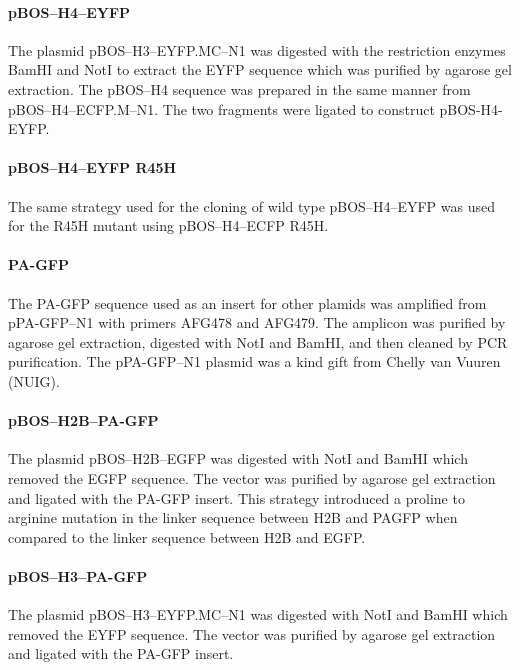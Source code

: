       \paragraph{pBOS--H4--EYFP}
      The plasmid pBOS--H3--EYFP.MC--N1 was digested with the
      restriction enzymes BamHI and NotI to extract the EYFP sequence
      which was purified by agarose gel extraction.  The pBOS--H4
      sequence was prepared in the same manner from
      pBOS--H4--ECFP.M--N1.  The two fragments were ligated to
      construct pBOS-H4-EYFP.

      \paragraph{pBOS--H4--EYFP R45H}
      The same strategy used for the cloning of wild type
      pBOS--H4--EYFP was used for the R45H mutant using
      pBOS--H4--ECFP R45H.

      \paragraph{PA-GFP}
      The PA-GFP sequence used as an insert for other plamids was
      amplified from pPA-GFP--N1 with primers AFG478 and AFG479.  The
      amplicon was purified by agarose gel extraction, digested with
      NotI and BamHI, and then cleaned by PCR purification.  The
      pPA-GFP--N1 plasmid was a kind gift from Chelly van Vuuren
      (NUIG).

      \paragraph{pBOS--H2B--PA-GFP}
      The plasmid pBOS--H2B--EGFP was digested with NotI and BamHI
      which removed the EGFP sequence.  The vector was purified by
      agarose gel extraction and ligated with the PA-GFP insert.  This
      strategy introduced a proline to arginine mutation in the linker
      sequence between H2B and PAGFP when compared to the linker
      sequence between H2B and EGFP.

      \paragraph{pBOS--H3--PA-GFP}
      The plasmid pBOS--H3--EYFP.MC--N1 was digested with NotI and
      BamHI which removed the EYFP sequence.  The vector was purified
      by agarose gel extraction and ligated with the PA-GFP insert.

